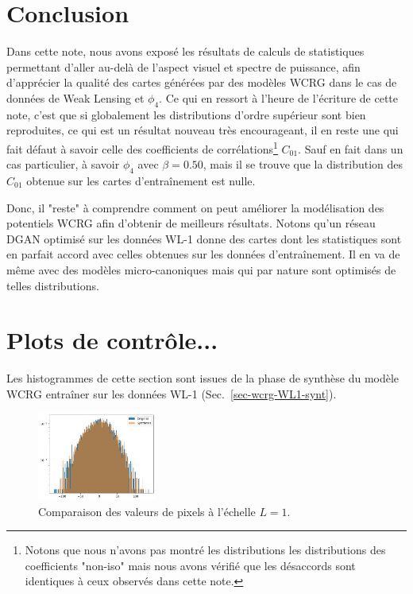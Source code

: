 \documentclass[12pt,twoside]{article}
\begin{document}
\section{Conclusion}
% 
Dans cette note, nous avons exposé les résultats de calculs de statistiques permettant d'aller au-delà de l'aspect visuel et spectre de puissance, afin d'apprécier la qualité des cartes générées par des modèles WCRG dans le cas de données de Weak Lensing et $\phi_4$. Ce qui en ressort à l'heure de l'écriture de cette note, c'est que si globalement les distributions d'ordre supérieur sont bien reproduites, ce qui est un résultat nouveau très encourageant, il en reste une qui fait défaut à savoir celle des coefficients de corrélations\footnote{Notons que nous n'avons pas montré les distributions les distributions des coefficients "non-iso" mais nous avons vérifié que  les désaccords sont identiques à ceux observés dans cette note.} $C_{01}$.  Sauf en fait dans un cas particulier, à savoir $\phi_4$ avec $\beta=0.50$, mais il se trouve que la distribution des $C_{01}$ obtenue sur les cartes d'entraînement est nulle.

Donc, il "reste" à comprendre comment on peut améliorer la modélisation des potentiels WCRG afin d'obtenir de meilleurs résultats. Notons qu'un réseau DGAN optimisé sur les données WL-1 donne des cartes dont les statistiques sont en parfait accord avec celles obtenues sur les données d'entraînement. Il en va de même avec des modèles micro-canoniques mais qui par nature sont optimisés de telles distributions.

\appendix
\section{Plots de contrôle...}
Les histogrammes de cette section sont issues de la phase de synthèse du modèle WCRG entraîner sur les données WL-1 (Sec.~\ref{sec-wcrg-WL1-synt}).
\begin{figure}[h]
\centering
\includegraphics[width=0.35\textwidth]{fig-WL1-synt-L1-pixelval.png}
\caption{Comparaison des valeurs de pixels à l'échelle $L=1$.}
\label{fig-WL1-synt-L1-pixelval}
\end{figure}
\end{document}
